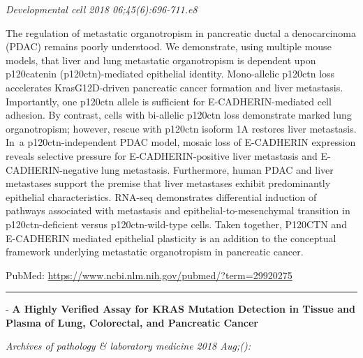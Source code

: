\documentclass[]{article}
\begin{document}
\emph{Developmental cell 2018 06;45(6):696-711.e8}

The regulation of metastatic organotropism in pancreatic ductal a
denocarcinoma (PDAC) remains poorly understood. We demonstrate, using
multiple mouse models, that liver and lung metastatic organotropism is
dependent upon p120catenin (p120ctn)-mediated epithelial identity.
Mono-allelic p120ctn loss accelerates KrasG12D-driven pancreatic cancer
formation and liver metastasis. Importantly, one p120ctn allele is
sufficient for E-CADHERIN-mediated cell adhesion. By contrast, cells
with bi-allelic p120ctn loss demonstrate marked lung organotropism;
however, rescue with p120ctn isoform 1A restores liver metastasis. In~a
p120ctn-independent PDAC model, mosaic loss of E-CADHERIN expression
reveals selective pressure for E-CADHERIN-positive liver metastasis and
E-CADHERIN-negative lung metastasis. Furthermore, human PDAC and liver
metastases support the premise that liver metastases exhibit
predominantly epithelial characteristics. RNA-seq demonstrates
differential induction of pathways associated with metastasis and
epithelial-to-mesenchymal transition in p120ctn-deficient versus
p120ctn-wild-type cells. Taken together, P120CTN and E-CADHERIN mediated
epithelial plasticity is an addition to the conceptual framework
underlying metastatic organotropism in pancreatic cancer.

PubMed: \url{https://www.ncbi.nlm.nih.gov/pubmed/?term=29920275}

{}

{}

\begin{center}\rule{0.5\linewidth}{\linethickness}\end{center}

 - \textbf{A Highly Verified Assay for KRAS Mutation Detection in Tissue
and Plasma of Lung, Colorectal, and Pancreatic Cancer}

\emph{Archives of pathology \& laboratory medicine 2018 Aug;():}
\end{document}
